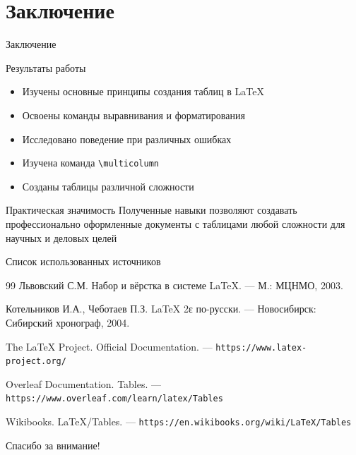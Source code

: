 \documentclass[aspectratio=169]{beamer}
\begin{document}
\section{Заключение}

\begin{frame}{Заключение}
    \begin{block}{Результаты работы}
        \begin{itemize}
            \item Изучены основные принципы создания таблиц в LaTeX
            \item Освоены команды выравнивания и форматирования
            \item Исследовано поведение при различных ошибках
            \item Изучена команда \texttt{\textbackslash multicolumn}
            \item Созданы таблицы различной сложности
        \end{itemize}
    \end{block}
    
    \vspace{0.5cm}
    
    \begin{exampleblock}{Практическая значимость}
        Полученные навыки позволяют создавать профессионально оформленные документы с таблицами любой сложности для научных и деловых целей
    \end{exampleblock}
\end{frame}

\begin{frame}{Список использованных источников}
    \begin{thebibliography}{99}
         Львовский С.М. Набор и вёрстка в системе LaTeX. — М.: МЦНМО, 2003.
        
         Котельников И.А., Чеботаев П.З. LaTeX 2ε по-русски. — Новосибирск: Сибирский хронограф, 2004.
        
         The LaTeX Project. Official Documentation. — \texttt{https://www.latex-project.org/}
        
         Overleaf Documentation. Tables. — \texttt{https://www.overleaf.com/learn/latex/Tables}
        
         Wikibooks. LaTeX/Tables. — \texttt{https://en.wikibooks.org/wiki/LaTeX/Tables}
    \end{thebibliography}
\end{frame}

\begin{frame}[plain]
    \begin{center}
        \Huge Спасибо за внимание!
    \end{center}
\end{frame}
\end{document}
